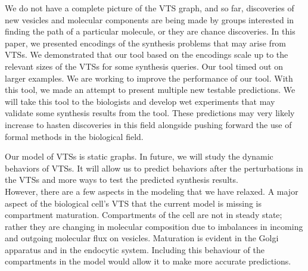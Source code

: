 \noindent 
%
We do not have a complete picture of the VTS graph, and so far, discoveries of new vesicles and molecular components are being made by groups interested in finding the path of a particular molecule, or they are chance discoveries. 
%
In this paper, we presented encodings of the synthesis problems
that may arise from VTSs.
%
%
We demonstrated that our tool based on the encodings
scale up to the relevant sizes of the VTSs for some synthesis queries.
%
Our tool timed out on larger examples.
%
We are working to improve the performance of our tool.
%
%
With this tool, we made an attempt to present multiple new testable predictions. 
%
We will take this tool to the biologists and develop wet experiments that may validate some synthesis results from the tool.
%
These predictions may very likely increase to hasten discoveries in this field alongside pushing forward the use of formal methods in the biological field.

Our model of VTSs is static graphs.
%
In future, we will study the dynamic behaviors of VTSs.
%
It will allow us to predict behaviors after the perturbations in the VTSs
and more ways to test the predicted synthesis results.\\

However, there are a few aspects in the modeling that we have relaxed.
A major aspect of the biological cell’s VTS that the current model is missing is compartment maturation. Compartments of the cell are not in steady state; rather they are changing in molecular composition due to imbalances in incoming and outgoing molecular flux on vesicles.
Maturation  is  evident  in  the  Golgi  apparatus  and  in  the  endocytic system. 
Including this behaviour of the compartments in the model would allow it to make more accurate predictions.
